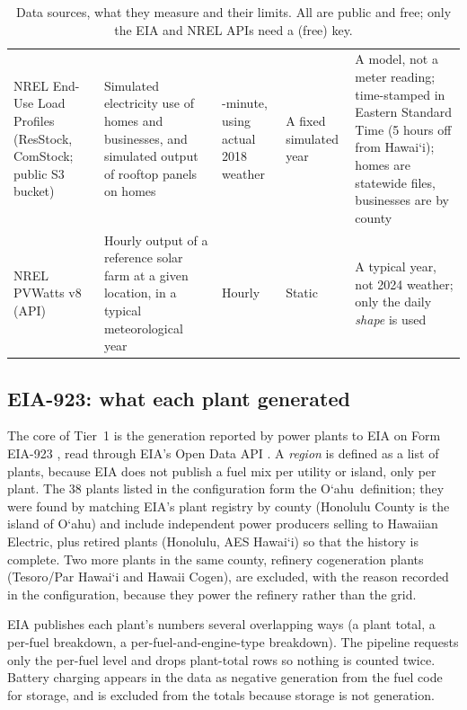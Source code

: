 \documentclass[11pt,a4paper]{article}
\newcommand{\okina}{\textquoteleft}
\newcommand{\Oahu}{\texorpdfstring{O\okina ahu}{Oahu}}
\newcommand{\Hawaii}{\texorpdfstring{Hawai\okina i}{Hawaii}}
\begin{document}
\begin{table}[htbp]
\begin{tabularx}{\textwidth}{@{}>{\raggedright\arraybackslash}p{2.5cm}>{\raggedright\arraybackslash}p{3.3cm}>{\raggedright\arraybackslash}p{2.5cm}>{\raggedright\arraybackslash}p{2.3cm}X@{}}
\addlinespace
NREL End-Use Load Profiles (ResStock, ComStock; public S3 bucket) &
 Simulated electricity use of homes and businesses, and simulated output of rooftop panels on homes &
 15-minute, using actual 2018 weather &
 A fixed simulated year &
 A model, not a meter reading; time-stamped in Eastern Standard Time (5 hours off from \Hawaii); homes are statewide files, businesses are by county \\
\addlinespace
NREL PVWatts v8 (API) &
 Hourly output of a reference solar farm at a given location, in a typical meteorological year &
 Hourly &
 Static &
 A typical year, not 2024 weather; only the daily \emph{shape} is used \\
\bottomrule
\end{tabularx}
\caption{Data sources, what they measure and their limits. All are public and free; only the EIA and NREL APIs
need a (free) key.}
\label{tab:sources}
\end{table}

\subsection{EIA-923: what each plant generated}
The core of Tier~1 is the generation reported by power plants to EIA on Form EIA-923 \cite{eia923}, read through
EIA's Open Data API \cite{eia-api}. A \emph{region} is
defined as a list of plants, because EIA does not publish a fuel mix per utility or island, only per plant.
The 38 plants listed in the configuration form the \Oahu\ definition; they were found by matching EIA's plant
registry by county (Honolulu County is the island of \Oahu) and include independent power producers selling to Hawaiian Electric,
plus retired plants (Honolulu, AES Hawai\okina i) so that the history is complete. Two more plants in the same county, refinery
cogeneration plants (Tesoro/Par Hawai\okina i and Hawaii Cogen), are excluded, with the reason recorded in the
configuration, because they power the refinery rather than the grid.

EIA publishes each plant's numbers several overlapping ways (a plant total, a per-fuel breakdown, a
per-fuel-and-engine-type breakdown). The pipeline requests only the per-fuel level and drops plant-total rows so
nothing is counted twice. Battery charging appears in the data as negative generation from the fuel code for
storage, and is excluded from the totals because storage is not generation.
\end{document}
